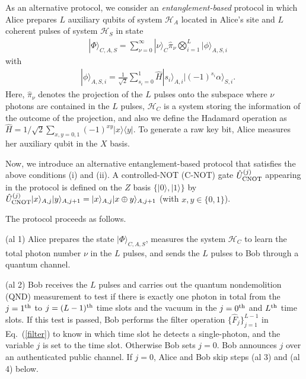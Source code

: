 \documentclass[prl,twocolumn,superscriptaddress,nofootinbib]{revtex4}
\def\U#1{{\rm #1}}
\newcommand{\bra}[1]{\langle #1 |}
\newcommand{\ket}[1]{| #1 \rangle}
\begin{document}
As an alternative protocol, we consider an {\it entanglement-based} protocol in which Alice prepares
$L$ auxiliary qubits of system $\mathcal{H}_A$ located in Alice's site and $L$ coherent pulses of system $\mathcal{H}_S$ in state
\begin{align}
  &\ket{\Phi}_{C,A,S}=\sum^\infty_{\nu=0}\ket{\nu}_C\hat{\pi}_\nu\bigotimes^L_{i=1}\ket{\phi}_{A,S,i}
  \label{alterAlice}
\end{align}
with
\begin{align}
  &\ket{\phi}_{A,S,i}=\frac{1}{\sqrt{2}}\sum^1_{s_i=0}\hat{H}\ket{s_i}_{A,i}\ket{(-1)^{s_i}\alpha}_{S,i}. 
    \label{alterAlicei}
\end{align}
Here, $\hat{\pi}_\nu$ denotes the projection of the $L$ pulses onto the subspace where $\nu$ photons are contained in the $L$ pulses,
$\mathcal{H}_C$ is a system storing the information of the outcome of the projection,
and also we define the Hadamard operation as $\hat{H}=1/\sqrt{2}\sum_{x,y=0,1}(-1)^{xy}\ket{x}\bra{y}$.
To generate a raw key bit, Alice measures her auxiliary qubit in the $X$ basis.

Now, we introduce an alternative entanglement-based protocol that satisfies the above conditions (i) and (ii). 
A controlled-NOT (C-NOT) gate $\hat{U}^{(j)}_{\U{CNOT}}$ appearing in the protocol is defined on the $Z$ basis $\{\ket{0},\ket{1}\}$
by $\hat{U}^{(j)}_{\U{CNOT}}\ket{x}_{A,j}\ket{y}_{A,j+1}=\ket{x}_{A,j}\ket{x\oplus y}_{A,j+1}$ (with $x,y\in\{0,1\}$). 
   
              The protocol proceeds as follows.

              (al 1) Alice prepares the state $\ket{\Phi}_{C,A,S}$, 
              measures the system $\mathcal{H}_C$ to learn the total photon number $\nu$ in the $L$ pulses, 
              and sends the $L$ pulses to Bob through a quantum channel.
  
  (al 2) Bob receives the $L$ pulses and carries out the quantum nondemolition (QND)
  measurement to test if there is exactly 
  one photon in total from the $j=1^{\U{th}}$ to $j=(L-1)^{\U{th}}$ time slots and the vacuum in the 
  $j=0^{\U{th}}$ and $L^{\U{th}}$ time slots. If this test is passed, Bob performs the filter operation $\{\hat{F}_j\}^{L-1}_{j=1}$
  in Eq.~(\ref{filter}) to know in which time slot he detects a single-photon, and the variable $j$ is set to the time slot.
  Otherwise Bob sets $j=0$. Bob announces $j$ over an authenticated public channel. 
  If $j=0$, Alice and Bob skip steps (al 3) and (al 4) below. 
  
\end{document}

